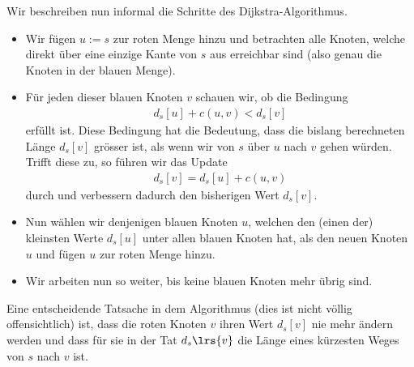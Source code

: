 \noindent
Wir beschreiben nun informal die Schritte des Dijkstra-Algorithmus.
\begin{itemize}
    \item Wir fügen $u:=s$ zur roten Menge hinzu und betrachten alle Knoten, welche direkt über eine einzige Kante von $s$ aus erreichbar sind (also genau die Knoten in der blauen Menge).
    \item Für jeden dieser blauen Knoten $v$ schauen wir, ob die Bedingung
    \begin{align*}
        d_s[u] + c(u,v) < d_s[v]
    \end{align*}
    erfüllt ist. Diese Bedingung hat die Bedeutung, dass die bislang berechneten Länge $d_s[v]$ grösser ist, als wenn wir von $s$ über $u$ nach $v$ gehen würden. Trifft diese zu, so führen wir das Update
    \begin{align*}
        d_s[v] = d_s[u] + c(u,v)
    \end{align*}
    durch und verbessern dadurch den bisherigen Wert $d_s[v]$.
    \item Nun wählen wir denjenigen blauen Knoten $u$, welchen den (einen der) kleinsten Werte $d_s[u]$ unter allen blauen Knoten hat, als den neuen Knoten $u$ und fügen $u$ zur roten Menge hinzu.
    \item Wir arbeiten nun so weiter, bis keine blauen Knoten mehr übrig sind.
\end{itemize}
Eine entscheidende Tatsache in dem Algorithmus (dies ist nicht völlig offensichtlich) ist, dass die roten Knoten $v$ ihren Wert $d_s[v]$ nie mehr ändern werden und dass für sie in der Tat  $d_s\lrs{v}$ die Länge eines kürzesten Weges von $s$ nach $v$ ist.


